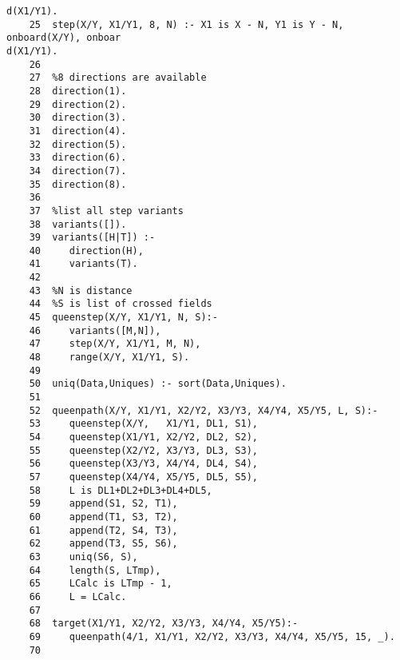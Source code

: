 \begin{verbatim}
d(X1/Y1).
    25  step(X/Y, X1/Y1, 8, N) :- X1 is X - N, Y1 is Y - N, onboard(X/Y), onboar
d(X1/Y1).
    26   
    27  %8 directions are available
    28  direction(1).
    29  direction(2).
    30  direction(3).
    31  direction(4).
    32  direction(5).
    33  direction(6).
    34  direction(7).
    35  direction(8).
    36   
    37  %list all step variants
    38  variants([]).
    39  variants([H|T]) :-
    40     direction(H),
    41     variants(T).
    42   
    43  %N is distance
    44  %S is list of crossed fields
    45  queenstep(X/Y, X1/Y1, N, S):-
    46     variants([M,N]),
    47     step(X/Y, X1/Y1, M, N),
    48     range(X/Y, X1/Y1, S).
    49   
    50  uniq(Data,Uniques) :- sort(Data,Uniques).
    51   
    52  queenpath(X/Y, X1/Y1, X2/Y2, X3/Y3, X4/Y4, X5/Y5, L, S):-
    53     queenstep(X/Y,   X1/Y1, DL1, S1),
    54     queenstep(X1/Y1, X2/Y2, DL2, S2),
    55     queenstep(X2/Y2, X3/Y3, DL3, S3),
    56     queenstep(X3/Y3, X4/Y4, DL4, S4),
    57     queenstep(X4/Y4, X5/Y5, DL5, S5),
    58     L is DL1+DL2+DL3+DL4+DL5,
    59     append(S1, S2, T1),
    60     append(T1, S3, T2),
    61     append(T2, S4, T3),
    62     append(T3, S5, S6),
    63     uniq(S6, S),
    64     length(S, LTmp),
    65     LCalc is LTmp - 1,
    66     L = LCalc.
    67   
    68  target(X1/Y1, X2/Y2, X3/Y3, X4/Y4, X5/Y5):-
    69     queenpath(4/1, X1/Y1, X2/Y2, X3/Y3, X4/Y4, X5/Y5, 15, _).
    70
\end{verbatim}
